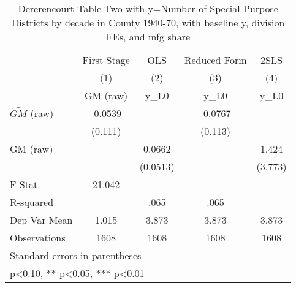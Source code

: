 \begin{table}[htbp]\centering
\def\sym#1{\ifmmode^{#1}\else\(^{#1}\)\fi}
\caption{Dererencourt Table Two with y=Number of Special Purpose Districts by decade in County 1940-70, with baseline y, division FEs, and mfg share}
\begin{tabular}{l*{4}{c}}
\toprule
                    & First Stage   &         OLS   &Reduced Form   &        2SLS   \\
                    &\multicolumn{1}{c}{(1)}&\multicolumn{1}{c}{(2)}&\multicolumn{1}{c}{(3)}&\multicolumn{1}{c}{(4)}\\
                    &\multicolumn{1}{c}{GM  (raw)}&\multicolumn{1}{c}{y\_L0}&\multicolumn{1}{c}{y\_L0}&\multicolumn{1}{c}{y\_L0}\\
\midrule
$\hat{GM}$ (raw)    &     -0.0539   &               &     -0.0767   &               \\
                    &     (0.111)   &               &     (0.113)   &               \\
\addlinespace
GM  (raw)           &               &      0.0662   &               &       1.424   \\
                    &               &    (0.0513)   &               &     (3.773)   \\
\midrule
F-Stat              &      21.042   &               &               &               \\
R-squared           &               &        .065   &        .065   &               \\
Dep Var Mean        &       1.015   &       3.873   &       3.873   &       3.873   \\
Observations        &        1608   &        1608   &        1608   &        1608   \\
\bottomrule
\multicolumn{5}{l}{\footnotesize Standard errors in parentheses}\\
\multicolumn{5}{l}{\footnotesize * p<0.10, ** p<0.05, *** p<0.01}\\
\end{tabular}
\end{table}
